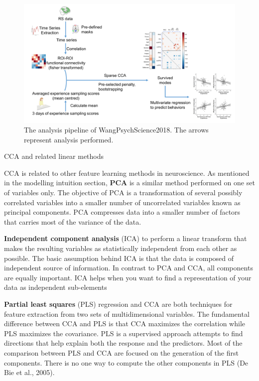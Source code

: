\begin{figure}[H]
	\centering
	\includegraphics[width=1\textwidth]{cca/image/ccafig3.png}
	\caption{The analysis pipeline of WangPsychScience2018. The arrows represent analysis performed.}

	\label{fig:methods:fig3}
\end{figure}


\begin{infobox}{CCA and related linear methods}

CCA is related to other feature learning methods in neuroscience. As mentioned in the modelling intuition section, \textbf{PCA} is a similar method performed on one set of variables only. The objective of PCA is a transformation of several possibly correlated variables into a smaller number of uncorrelated variables known as principal components. PCA compresses data into a smaller number of factors that carries most of the variance of the data.

\textbf{Independent component analysis} (ICA) to perform a linear transform that makes the resulting variables as statistically independent from each other as possible. The basic assumption behind ICA is that the data is composed of independent source of information. In contrast to PCA and CCA, all components are equally important.  ICA helps when you want to find a representation of your data as independent sub-elements

\textbf{Partial least squares} (PLS) regression and CCA are both techniques for feature extraction from two sets of multidimensional variables. The fundamental difference between CCA and PLS is that CCA maximizes the correlation while PLS maximizes the covariance. PLS is a supervised approach attempts to find directions that help explain both the response and the predictors. Most of the comparison between PLS and CCA are focused on the generation of the first components. There is no one way to compute the other components in PLS (De Bie et al., 2005).
\end{infobox}

